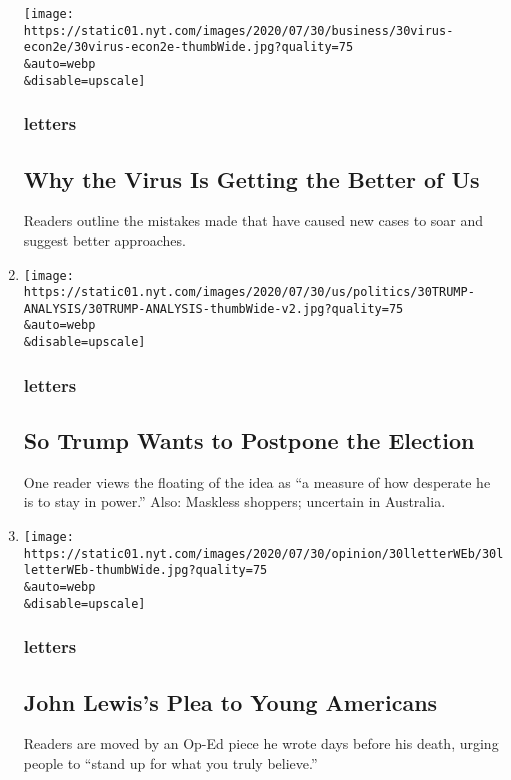 \begin{enumerate}
  \texttt{[image: https://static01.nyt.com/images/2020/07/30/business/30virus-econ2e/30virus-econ2e-thumbWide.jpg?quality=75\\\&auto=webp\\\&disable=upscale]}

  \hypertarget{letters-7}{%
  \subsubsection{letters}\label{letters-7}}

  \hypertarget{why-the-virus-is-getting-the-better-of-us}{%
  \subsection{Why the Virus Is Getting the Better of
  Us}\label{why-the-virus-is-getting-the-better-of-us}}

  Readers outline the mistakes made that have caused new cases to soar
  and suggest better approaches.
\item
  \href{/2020/07/31/opinion/letters/trump-election.html}{}

  \texttt{[image: https://static01.nyt.com/images/2020/07/30/us/politics/30TRUMP-ANALYSIS/30TRUMP-ANALYSIS-thumbWide-v2.jpg?quality=75\\\&auto=webp\\\&disable=upscale]}

  \hypertarget{letters-8}{%
  \subsubsection{letters}\label{letters-8}}

  \hypertarget{so-trump-wants-to-postpone-the-election}{%
  \subsection{So Trump Wants to Postpone the
  Election}\label{so-trump-wants-to-postpone-the-election}}

  One reader views the floating of the idea as ``a measure of how
  desperate he is to stay in power.'' Also: Maskless shoppers; uncertain
  in Australia.
\item
  \href{/2020/07/30/opinion/letters/john-lewis-civil-rights.html}{}

  \texttt{[image: https://static01.nyt.com/images/2020/07/30/opinion/30lletterWEb/30lletterWEb-thumbWide.jpg?quality=75\\\&auto=webp\\\&disable=upscale]}

  \hypertarget{letters-9}{%
  \subsubsection{letters}\label{letters-9}}

  \hypertarget{john-lewiss-plea-to-young-americans}{%
  \subsection{John Lewis's Plea to Young
  Americans}\label{john-lewiss-plea-to-young-americans}}

  Readers are moved by an Op-Ed piece he wrote days before his death,
  urging people to ``stand up for what you truly believe.''
\end{enumerate}


